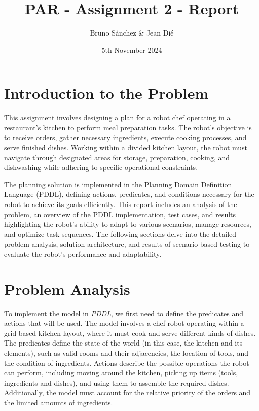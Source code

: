 \documentclass{article}
\begin{document}
\title{PAR - Assignment 2 - Report}
\author{\normalsize Bruno Sánchez \& Jean Dié}
\date{\small 5th November 2024}

\maketitle

\section{Introduction to the Problem}

This assignment involves designing a plan for a robot chef operating in a restaurant’s kitchen to perform meal preparation tasks. The robot’s objective is to receive orders, gather necessary ingredients, execute cooking processes, and serve finished dishes. Working within a divided kitchen layout, the robot must navigate through designated areas for storage, preparation, cooking, and dishwashing while adhering to specific operational constraints.

The planning solution is implemented in the Planning Domain Definition Language (PDDL), defining actions, predicates, and conditions necessary for the robot to achieve its goals efficiently. This report includes an analysis of the problem, an overview of the PDDL implementation, test cases, and results highlighting the robot’s ability to adapt to various scenarios, manage resources, and optimize task sequences. The following sections delve into the detailed problem analysis, solution architecture, and results of scenario-based testing to evaluate the robot’s performance and adaptability.

\section{Problem Analysis}

To implement the model in \textit{PDDL}, we first need to define the predicates and actions that will be used. The model involves a chef robot operating within a grid-based kitchen layout, where it must cook and serve different kinds of dishes. The predicates define the state of the world (in this case, the kitchen and its elements), such as valid rooms and their adjacencies, the location of tools, and the condition of ingredients. Actions describe the possible operations the robot can perform, including moving around the kitchen, picking up items (tools, ingredients and dishes), and using them to assemble the required dishes. Additionally, the model must account for the relative priority of the orders and the limited amounts of ingredients.
\end{document}
